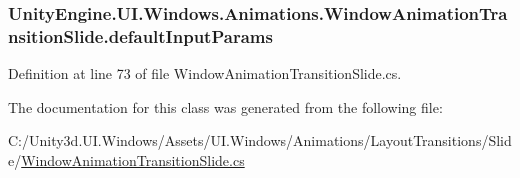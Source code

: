 \subsubsection[{default\+Input\+Params}]{ Unity\+Engine.\+U\+I.\+Windows.\+Animations.\+Window\+Animation\+Transition\+Slide.\+default\+Input\+Params}\label{class_unity_engine_1_1_u_i_1_1_windows_1_1_animations_1_1_window_animation_transition_slide_a3ebe0409f14d5c7343d5d4c21a27648a}


Definition at line 73 of file Window\+Animation\+Transition\+Slide.\+cs.



The documentation for this class was generated from the following file\+:\begin{DoxyCompactItemize}
\item 
C\+:/\+Unity3d.\+U\+I.\+Windows/\+Assets/\+U\+I.\+Windows/\+Animations/\+Layout\+Transitions/\+Slide/\hyperlink{_window_animation_transition_slide_8cs}{Window\+Animation\+Transition\+Slide.\+cs}\end{DoxyCompactItemize}
